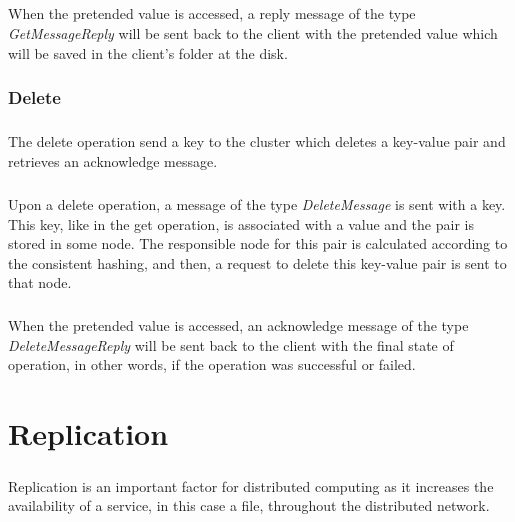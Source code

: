 \documentclass{report}
\begin{document}
					\paragraph{} When the pretended value is accessed, a reply message of the type
					\emph{GetMessageReply} will be sent back to the client with the pretended 
					value which will be saved in the client's folder at the disk.

				\subsection{Delete}
					\paragraph{} The delete operation send a key to the cluster which deletes
					a key-value pair and retrieves an acknowledge message.

					\paragraph{} Upon a delete operation, a message of the type \emph{DeleteMessage}
					is sent with a key. This key, like in the get operation, is associated 
					with a value and the pair is stored in some node. 
					The responsible node for this pair is calculated
					according to the consistent hashing, and then, a request to delete this
					key-value pair is sent to that node.

					\paragraph{} When the pretended value is accessed, an acknowledge message of 
					the type \emph{DeleteMessageReply} will be sent back to the client with 
					the final state of operation, in other words, if the operation was 
					successful or failed.
	
	\chapter{Replication}
	
	        \paragraph{} Replication is an important factor for distributed computing
			as it increases the availability of a service, in this case a file,
			throughout the distributed network.
	        
\end{document}
